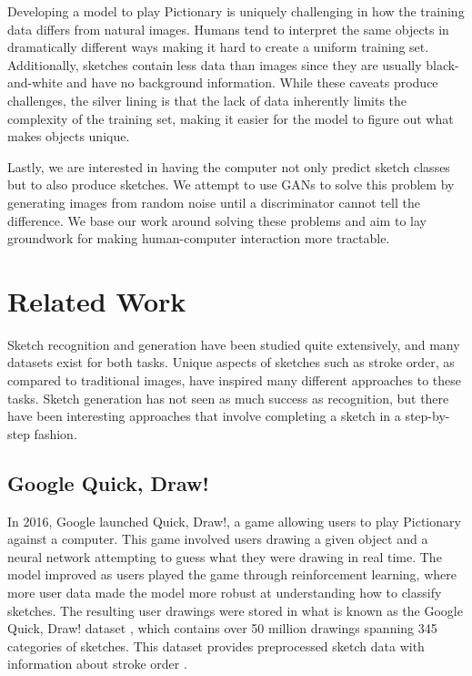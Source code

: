 \documentclass[10pt,twocolumn,letterpaper]{article}
\begin{document}
Developing a model to play Pictionary is uniquely challenging in how the training data differs from natural images. Humans tend to interpret the same objects in dramatically different ways making it hard to create a uniform training set. Additionally, sketches contain less data than images since they are usually black-and-white and have no background information. While these caveats produce challenges, the silver lining is that the lack of data inherently limits the complexity of the training set, making it easier for the model to figure out what makes objects unique.

Lastly, we are interested in having the computer not only predict sketch classes but to also produce sketches. We attempt to use GANs to solve this problem by generating images from random noise until a discriminator cannot tell the difference. We base our work around solving these problems and aim to lay groundwork for making human-computer interaction more tractable.

\section{Related Work}

Sketch recognition and generation have been studied quite extensively, and many datasets exist for both tasks. Unique aspects of sketches such as stroke order, as compared to traditional images, have inspired many different approaches to these tasks. Sketch generation has not seen as much success as recognition, but there have been interesting approaches that involve completing a sketch in a step-by-step fashion.

\subsection{Google Quick, Draw!}

In 2016, Google launched Quick, Draw!, a game allowing users to play Pictionary against a computer. This game involved users drawing a given object and a neural network attempting to guess what they were drawing in real time. The model improved as users played the game through reinforcement learning, where more user data made the model more robust at understanding how to classify sketches. The resulting user drawings were stored in what is known as the Google Quick, Draw! dataset \cite{QuickDraw}, which contains over 50 million drawings spanning 345 categories of sketches. This dataset provides preprocessed sketch data with information about stroke order \cite{QuickDraw}.
\end{document}
